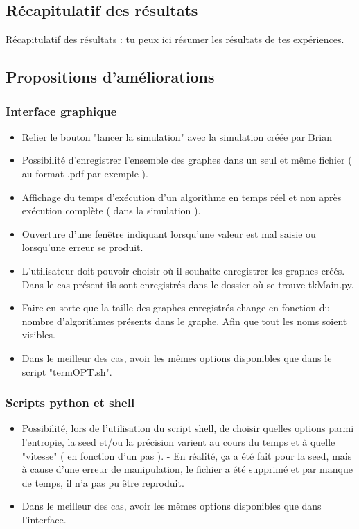 \documentclass[10pt,a4paper]{article}
\begin{document}
    \subsection{Récapitulatif des résultats}
    Récapitulatif des résultats : tu peux ici résumer les résultats de tes expériences.

    \subsection{Propositions d’améliorations}

    \subsubsection{Interface graphique}
    \begin{itemize}
        \item Relier le bouton "lancer la simulation" avec la simulation créée par Brian
        \item Possibilité d'enregistrer l'ensemble des graphes dans un seul et même fichier ( au format .pdf par exemple ).
        \item Affichage du temps d'exécution d'un algorithme en temps réel et non après exécution complète ( dans la simulation ). 
        \item Ouverture d'une fenêtre indiquant lorsqu'une valeur est mal saisie ou lorsqu'une erreur se produit.
        \item L'utilisateur doit pouvoir choisir où il souhaite enregistrer les graphes créés. Dans le cas présent ils sont enregistrés dans le dossier où se trouve tkMain.py.
        \item Faire en sorte que la taille des graphes enregistrés change en fonction du nombre d'algorithmes présents dans le graphe. Afin que tout les noms soient visibles.
        \item Dans le meilleur des cas, avoir les mêmes options disponibles que dans le script "termOPT.sh".
    \end{itemize}
    
    \subsubsection{Scripts python et shell}
    \begin{itemize}
        \item Possibilité, lors de l'utilisation du script shell, de choisir quelles options parmi l'entropie, la seed et/ou la précision varient au cours du temps et à quelle "vitesse" ( en fonction d'un pas ). - En réalité, ça a été fait pour la seed, mais à cause d'une erreur de manipulation, le fichier a été supprimé et par manque de temps, il n'a pas pu être reproduit. 
        \item Dans le meilleur des cas, avoir les mêmes options disponibles que dans l'interface.
    \end{itemize}
\end{document}
